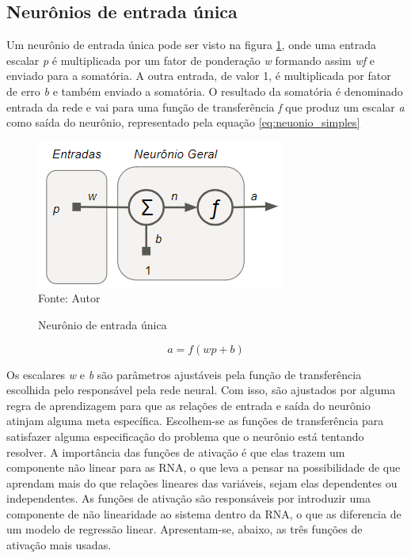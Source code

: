 \documentclass[
	12pt,				%
    oneside,			%
	a4paper,			%
	english,			%
	french,				%
	spanish,			%
	brazil,				%
	]{abntex2}
\begin{document}
\subsection {Neurônios de entrada única}

Um neurônio de entrada única pode ser visto na figura \ref{fig:Neurônio_geral1}, onde uma entrada escalar \textit{p} é multiplicada por um fator de ponderação \textit{w} formando assim \textit{wf} e enviado para a somatória. A outra entrada, de valor 1, é multiplicada por fator de erro \textit{b} e também enviado a somatória. O resultado da somatória é denominado entrada da rede e vai para uma função de transferência \textit{f} que produz um escalar \textit{a} como saída do neurônio, representado pela equação \ref{eq:neuonio_simples}

\begin{figure}[H]
    \centering
    \caption{Neurônio de entrada única}
    \includegraphics[scale=1]{Neuronio_geral1}\\
    Fonte: Autor\hfill
    \label{fig:Neurônio_geral1}
\end{figure}

  \begin{equation}
    a = {f(wp+b)}
    \label{eq:neuonio_simples}
  \end{equation}


 Os escalares \textit{w} e \textit{b} são parâmetros ajustáveis pela função de transferência escolhida pelo responsável pela rede neural. Com isso, são ajustados por alguma regra de aprendizagem para que as relações de entrada e saída do neurônio atinjam alguma meta específica. Escolhem-se as funções de transferência para satisfazer alguma especificação do problema que o neurônio está tentando resolver. A importância das funções de ativação é que elas trazem um componente não linear para as RNA, o que leva a pensar na possibilidade de que aprendam mais do que relações lineares das variáveis, sejam elas dependentes ou independentes. As funções de ativação são responsáveis por introduzir uma componente de não linearidade ao sistema dentro da RNA, o que as diferencia de um modelo de regressão linear. Apresentam-se, abaixo, as três funções de ativação mais usadas.
\end{document}
